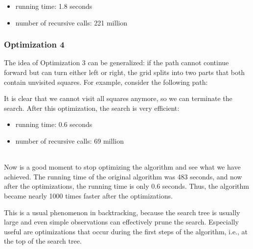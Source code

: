 \begin{itemize}
\item
running time: 1.8 seconds
\item
number of recursive calls: 221 million
\end{itemize}

\subsubsection{Optimization 4}

The idea of Optimization 3
can be generalized:
if the path cannot continue forward
but can turn either left or right,
the grid splits into two parts
that both contain unvisited squares.
For example, consider the following path:

\begin{center}
\end{center}
It is clear that we cannot visit all squares anymore,
so we can terminate the search.
After this optimization, the search is
very efficient:

\begin{itemize}
\item
running time: 0.6 seconds
\item
number of recursive calls: 69 million
\end{itemize}

~\\
Now is a good moment to stop optimizing
the algorithm and see what we have achieved.
The running time of the original algorithm
was 483 seconds,
and now after the optimizations,
the running time is only 0.6 seconds.
Thus, the algorithm became nearly 1000 times
faster after the optimizations.

This is a usual phenomenon in backtracking,
because the search tree is usually large
and even simple observations can effectively
prune the search.
Especially useful are optimizations that
occur during the first steps of the algorithm,
i.e., at the top of the search tree.

